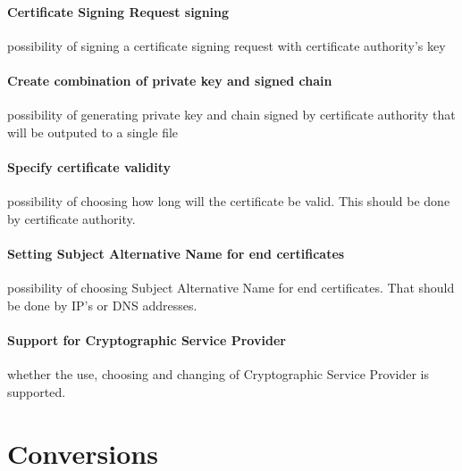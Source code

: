 \documentclass[10pt, a4paper]{report}
\begin{document}
\paragraph{Certificate Signing Request signing}
possibility of signing a certificate signing request with certificate authority's key

\paragraph{Create combination of private key and signed chain}
possibility of generating private key and chain signed by certificate authority that will be outputed to a single file

\paragraph{Specify certificate validity}
possibility of choosing how long will the certificate be valid. This should be done by certificate authority.

\paragraph{Setting Subject Alternative Name for end certificates}
possibility of choosing Subject Alternative Name for end certificates. That should be done by IP's or DNS addresses.

\paragraph{Support for Cryptographic Service Provider}
whether the use, choosing and changing of Cryptographic Service Provider is supported.


\section{Conversions}
\end{document}
